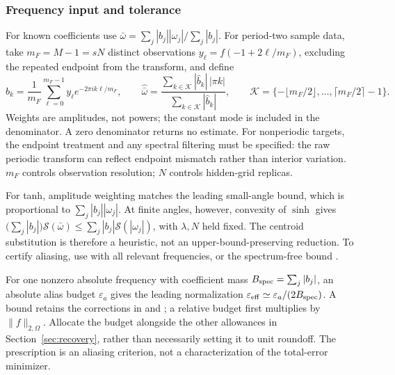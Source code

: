 \subsubsection{Frequency input and tolerance}
For known coefficients use
$\bar\omega=\sum_j|b_j||\omega_j|/\sum_j|b_j|$.
For period-two sample data, take $m_F=M-1=sN$ distinct observations
$y_\ell=f(-1+2\ell/m_F)$, excluding the repeated endpoint from the transform,
and define
\begin{equation}
 \widehat b_k=\frac1{m_F}\sum_{\ell=0}^{m_F-1}
      y_\ell e^{-2\pi i k\ell/m_F},\qquad
 \widehat{\bar\omega}
 =\frac{\sum_{k\in\mathcal K}|\widehat b_k|\,|\pi k|}
        {\sum_{k\in\mathcal K}|\widehat b_k|},\qquad
 \mathcal K=\{-\lfloor m_F/2\rfloor,\ldots,\lceil m_F/2\rceil-1\}.
 \label{eq:bandwidth-frequency-estimate}
\end{equation}
Weights are amplitudes, not powers; the constant mode is included in the
denominator. A zero denominator returns no estimate. For nonperiodic targets,
the endpoint treatment and any spectral filtering must be specified: the raw
periodic transform can reflect endpoint mismatch rather than interior
variation. $m_F$ controls observation resolution; $N$ controls hidden-grid replicas.

For tanh, amplitude weighting matches the leading small-angle bound, which is
proportional to $\sum_j|b_j||\omega_j|$. At finite angles, however, convexity
of $\sinh$ gives
$\bigl(\sum_j|b_j|\bigr)\mathcal S(\bar\omega)
 \le\sum_j|b_j|\mathcal S(|\omega_j|)$,
with $\lambda,N$ held fixed. The centroid substitution is therefore a
heuristic, not an upper-bound-preserving reduction. To certify aliasing, use
 with all relevant frequencies, or the
spectrum-free bound .

For one nonzero absolute frequency with coefficient mass
$B_{\rm spec}=\sum_j|b_j|$, an absolute alias budget $\varepsilon_a$ gives
the leading normalization $\varepsilon_{\rm eff}\simeq
\varepsilon_a/(2B_{\rm spec})$. A bound retains the corrections in
 and
; a relative budget first multiplies by
$\|f\|_{2,\Omega}$. Allocate the budget alongside the other allowances in
Section~\ref{sec:recovery}, rather than necessarily setting it to unit
roundoff. The prescription is an aliasing criterion, not a characterization
of the total-error minimizer.

